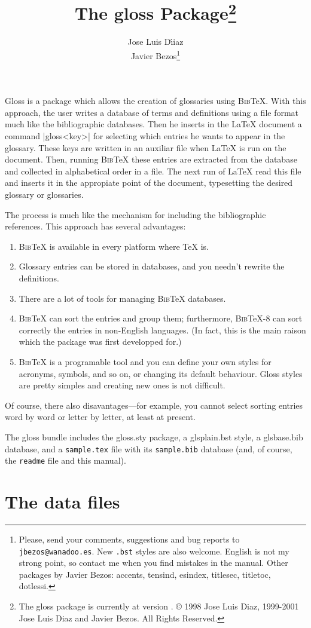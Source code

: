 \documentclass{ltxguide}
\title{The \textsf{gloss} Package\footnote{The
\textsf{gloss} package is currently at version \fileversion. \copyright{} 
1998 Jose Luis Diaz,
1999-2001 Jose Luis Diaz and Javier Bezos. All Rights Reserved.}}
\author{Jose Luis D\'{\i}iaz\\Javier Bezos\footnote{Please, send your 
comments, suggestions and bug reports to \texttt{jbezos@wanadoo.es}.  
New \texttt{.bst} styles are also welcome.  English is not my strong 
point, so contact me when you find mistakes in the manual.  Other 
packages by Javier Bezos: \textsf{accents, tensind, esindex, 
titlesec, titletoc, dotlessi}.}}
\date{\docdate}
\newcommand{\gloss}{\textsf{gloss}}
\newcommand{\bibTeX}{\textsc{Bib}\TeX}
\begin{document}
\maketitle

\textsf{Gloss} is a package which allows the creation of glossaries 
using \bibTeX. With this approach, the user writes a database of terms 
and definitions using a file format much like the bibliographic 
databases.  Then he inserts in the \LaTeX{} document a command 
|\gloss{<key>}| for selecting which entries he wants to appear in the 
glossary.  These keys are written in an auxiliar file when \LaTeX{} is 
run on the document.  Then, running \bibTeX{} these entries are 
extracted from the database and collected in alphabetical order in a 
file.  The next run of \LaTeX{} read this file and inserts it in the 
appropiate point of the document, typesetting the desired glossary or 
glossaries.

The process is much like the mechanism for including the bibliographic
references. This approach has several advantages:
\begin{enumerate}
\item \bibTeX{} is available in every platform where \TeX{} is.
\item Glossary entries can be stored in databases, and you needn't
  rewrite the definitions.
\item There are a lot of tools for managing \bibTeX{} databases.
\item \bibTeX{} can sort the entries and group them; furthermore,
  \bibTeX-8 can sort correctly the entries in non-English
  languages. (In fact, this is the main raison which the package
  was first developped for.)
\item \bibTeX{} is a programable tool and you can define your own 
  styles for acronyms, symbols, and so on, or changing its default 
  behaviour.  \textsf{Gloss} styles are pretty simples and creating
  new ones is not difficult.
\end{enumerate}

Of course, there also disavantages---for example, you cannot
select sorting entries word by word or letter by letter, at least
at present.

The gloss{} bundle includes the \textsf{gloss}.sty package, a 
\textsf{glsplain}.bst style, a \textsf{glsbase}.bib database, and a 
\texttt{sample.tex} file with its \texttt{sample.bib} database 
(and, of course, the \texttt{readme} file and this manual).

\section{The data files}
\end{document}
